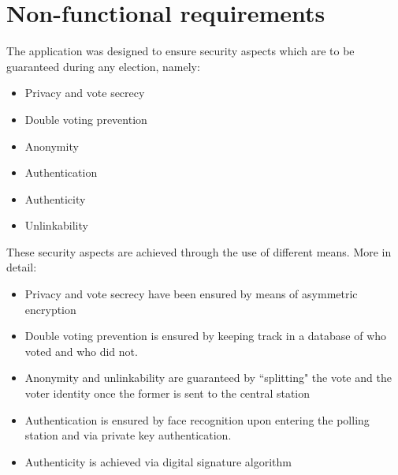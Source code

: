 \section{Non-functional requirements}\label{sec:non_func_req}
The application was designed to ensure security aspects which are to be guaranteed during any election, namely:\\
\begin{itemize}
	\item Privacy and vote secrecy
	\item Double voting prevention
	\item Anonymity
	\item Authentication
	\item Authenticity
	\item Unlinkability
\end{itemize}
\hfill \break
\noindent These security aspects are achieved through the use of different means. More in detail:\\
\begin{itemize}
	\item Privacy and vote secrecy have been ensured by means of asymmetric encryption
	\item Double voting prevention is ensured by keeping track in a database of who voted and who did not.
	\item Anonymity and unlinkability are guaranteed by ``splitting" the vote and the voter identity once the former is sent to the central station
	\item Authentication is ensured by face recognition upon entering the polling station and via private key authentication.
	\item Authenticity is achieved via digital signature algorithm
\end{itemize}